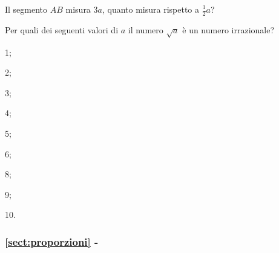 \begin{esercizio}
\label{ese:6.11}
Il segmento $AB$ misura $3a$, quanto misura rispetto a 
$\frac{1}{2}a$? 
\end{esercizio}

\begin{esercizio}
\label{ese:6.12}
Per quali dei seguenti valori di $a$ il numero $\sqrt{a}$ è un numero 
irrazionale?
\begin{multicols}{5}
\begin{enumeratea}
\item 1;
\item 2;
\item 3;
\item 4;
\item 5;
\item 6;
\item 8;
\item 9;
\item 10.
\end{enumeratea}
\end{multicols}
\end{esercizio}

\begingroup
\hypersetup{linkcolor=black}
\subsubsection*{\ref{sect:proporzioni} - }
\endgroup

